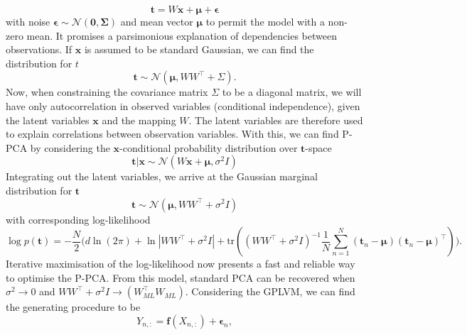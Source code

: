 \begin{equation}%
	\bm{t} = W\bm{x} + \bm{\mu} + \bm{\epsilon}
\label{eq:Factor_Analysis}
\end{equation}
with noise $\bm{\epsilon} \sim \mathcal{N}(\bm{0, \Sigma})$ and mean vector $\bm{\mu}$ to permit the model with a non-zero mean. It promises a parsimonious explanation of dependencies between observations. If $\bm{x}$ is assumed to be standard Gaussian, we can find the distribution for $t$ 
\begin{equation}%
	\bm{t} \sim \mathcal{N}(\bm{\mu}, WW^{\top} + \Sigma).
\label{eq: Factor analysis results}
\end{equation}
Now, when constraining the covariance matrix $\Sigma$ to be a diagonal matrix, we will have only autocorrelation in observed variables (conditional independence), given the latent variables $\bm{x}$ and the mapping $W$. The latent variables are therefore used to explain correlations between observation variables. \newline
With this, we can find P-PCA by considering the $\bm{x}$-conditional probability distribution over $\bm{t}$-space
\begin{equation}%
	\bm{t}|\bm{x} \sim \mathcal{N}(W\bm{x} + \bm{\mu}, \sigma^2I)
\label{eq: x-conditional probability dist over t-space}
\end{equation}
Integrating out the latent variables, we arrive at the Gaussian marginal distribution for $\bm{t}$
\begin{equation}%
	\bm{t} \sim \mathcal{N}(\bm{\mu}, WW^{\top} + \sigma^2I)
\label{eq: marginal distribution t}
\end{equation}
with corresponding log-likelihood
\begin{equation}%
	\log p(\bm{t}) = -\frac{N}{2} \Big(d \ln(2\pi) + \ln|WW^{\top} + \sigma^2I| + \text{tr}((WW^{\top} + \sigma^2I)^{-1}\frac{1}{N}\sum_{n=1}^{N}(\bm{t}_n - \bm{\mu})(\bm{t}_n - \bm{\mu})^{\top}) \Big).
\label{eq: log likelihood p-pca}
\end{equation}
Iterative maximisation of the log-likelihood now presents a fast and reliable way to optimise the P-PCA. From this model, standard PCA can be recovered when $\sigma^2 \to 0$ and $ WW^{\top} + \sigma^2I \to (W_{ML}^{\top}W_{ML})$. 
\newline \newline
Considering the GPLVM, we can find the generating procedure to be
\begin{equation}%
	Y_{n,:} = \bm{f}(X_{n,:}) + \bm{\epsilon}_n,
\label{eq: generating procedure GPLVM}
\end{equation} 
